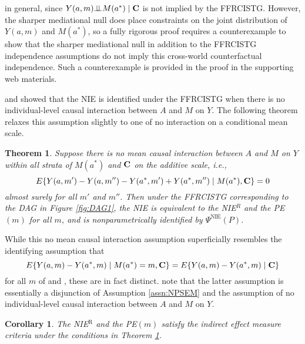 \documentclass[12pt]{article}
\newtheorem{theorem}{Theorem}
\newtheorem{corollary}{Corollary}
\def\ci{\mbox{\ensuremath{\perp\!\!\!\perp}}}
\begin{document}
in general, since $Y(a,m)\ci M(a^*)\mid {\bf C}$ is not implied by the FFRCISTG. %
However, the sharper mediational null does place constraints on the joint distribution of $Y(a,m)$ and $M(a^*)$, so a fully rigorous proof requires a counterexample to show that the sharper mediational null in addition to the FFRCISTG independence assumptions do not imply this cross-world counterfactual independence. Such a counterexample is provided in the proof in the supporting web materials.

\cite{robins1992identifiability} and \cite{robins2003semantics} showed that the NIE is identified under the FFRCISTG %
when there is no individual-level causal interaction between $A$ and $M$ on $Y$. %
The following theorem relaxes this assumption slightly to one of no interaction on a conditional mean scale. %
\begin{theorem}
    \label{thm:no-AM-interaction}
    Suppose there is no mean %
    causal interaction between $A$ and $M$ on $Y$ within all strata of $M(a^*)$ and $\bf C$ on the additive scale, i.e., 
    \[E\{Y(a,m')-Y(a,m'')-Y(a^*,m')+Y(a^*,m'')\mid M(a^*),{\bf C}\}=0\]
    almost surely for all $m'$ and $m''$. Then under the FFRCISTG corresponding to the DAG in Figure \ref{fig:DAG1}, the NIE is equivalent to the NIE$^{R}$ and the PE$(m)$ for all $m$, and is nonparametrically identified by $\Psi^{\text{NIE}}(P)$.
\end{theorem}
While this no mean causal interaction assumption superficially resembles the identifying assumption that
\[E\{Y(a,m)-Y(a^*,m)\mid M(a^*)=m,{\bf C}\}=E\{Y(a,m)-Y(a^*,m)\mid {\bf C}\}\]
for all $m$ of \cite{petersen2006estimation} and \cite{van2008direct}, these are in fact distinct. \cite{vanderweele2009conceptual} note that the latter assumption is essentially a disjunction of Assumption \ref{assn:NPSEM} and the assumption of no individual-level causal interaction between $A$ and $M$ on $Y$.
\begin{corollary}
    \label{cor:no-AM-interaction}
    The NIE$^{\text{R}}$ and the PE$(m)$ satisfy the indirect effect measure criteria under the conditions in Theorem \ref{thm:no-AM-interaction}.
\end{corollary}
\end{document}

